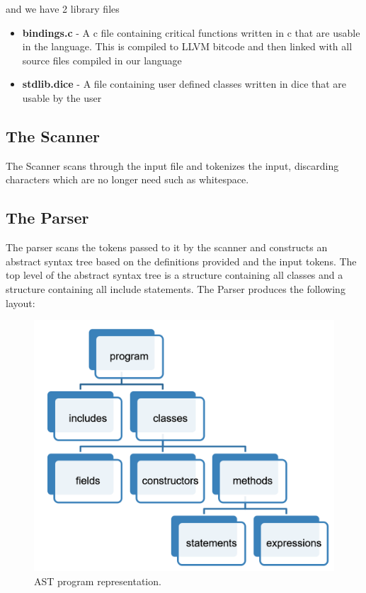 \begin{homeworkProblem}
	and we have 2 library files
	\begin{itemize}
		\item \textbf{bindings.c} - A c file containing critical functions written in c that are usable in the language. This is compiled to LLVM bitcode and then linked with all source files compiled in our language
		\item \textbf{stdlib.dice} - A file containing user defined classes written in dice that are usable by the user
	\end{itemize}
	
	\subsection{The Scanner}
	The Scanner scans through the input file and tokenizes the input, discarding characters which are no longer need such as whitespace.
	
	\subsection{The Parser}
	The parser scans the tokens passed to it by the scanner and constructs an abstract syntax tree based on the definitions provided and the input tokens. The top level of the abstract syntax tree is a structure containing all classes and a structure containing all include statements. The Parser produces the following layout: 
	 \begin{figure}[!ht]
	 	\centering
	 	\includegraphics[width=4.5in]{Includes/ast}
	 	\caption{AST program representation.}
	 \end{figure}

\end{homeworkProblem}
